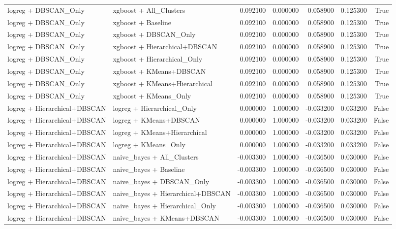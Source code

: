 \begin{tabular}{llrrrrr}
logreg + DBSCAN_Only & xgboost + All_Clusters & 0.092100 & 0.000000 & 0.058900 & 0.125300 & True \\
logreg + DBSCAN_Only & xgboost + Baseline & 0.092100 & 0.000000 & 0.058900 & 0.125300 & True \\
logreg + DBSCAN_Only & xgboost + DBSCAN_Only & 0.092100 & 0.000000 & 0.058900 & 0.125300 & True \\
logreg + DBSCAN_Only & xgboost + Hierarchical+DBSCAN & 0.092100 & 0.000000 & 0.058900 & 0.125300 & True \\
logreg + DBSCAN_Only & xgboost + Hierarchical_Only & 0.092100 & 0.000000 & 0.058900 & 0.125300 & True \\
logreg + DBSCAN_Only & xgboost + KMeans+DBSCAN & 0.092100 & 0.000000 & 0.058900 & 0.125300 & True \\
logreg + DBSCAN_Only & xgboost + KMeans+Hierarchical & 0.092100 & 0.000000 & 0.058900 & 0.125300 & True \\
logreg + DBSCAN_Only & xgboost + KMeans_Only & 0.092100 & 0.000000 & 0.058900 & 0.125300 & True \\
logreg + Hierarchical+DBSCAN & logreg + Hierarchical_Only & 0.000000 & 1.000000 & -0.033200 & 0.033200 & False \\
logreg + Hierarchical+DBSCAN & logreg + KMeans+DBSCAN & 0.000000 & 1.000000 & -0.033200 & 0.033200 & False \\
logreg + Hierarchical+DBSCAN & logreg + KMeans+Hierarchical & 0.000000 & 1.000000 & -0.033200 & 0.033200 & False \\
logreg + Hierarchical+DBSCAN & logreg + KMeans_Only & 0.000000 & 1.000000 & -0.033200 & 0.033200 & False \\
logreg + Hierarchical+DBSCAN & naive_bayes + All_Clusters & -0.003300 & 1.000000 & -0.036500 & 0.030000 & False \\
logreg + Hierarchical+DBSCAN & naive_bayes + Baseline & -0.003300 & 1.000000 & -0.036500 & 0.030000 & False \\
logreg + Hierarchical+DBSCAN & naive_bayes + DBSCAN_Only & -0.003300 & 1.000000 & -0.036500 & 0.030000 & False \\
logreg + Hierarchical+DBSCAN & naive_bayes + Hierarchical+DBSCAN & -0.003300 & 1.000000 & -0.036500 & 0.030000 & False \\
logreg + Hierarchical+DBSCAN & naive_bayes + Hierarchical_Only & -0.003300 & 1.000000 & -0.036500 & 0.030000 & False \\
logreg + Hierarchical+DBSCAN & naive_bayes + KMeans+DBSCAN & -0.003300 & 1.000000 & -0.036500 & 0.030000 & False \\

\end{tabular}

